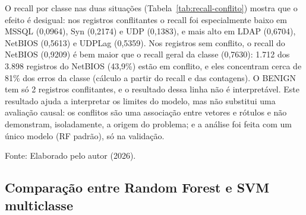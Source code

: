 \documentclass[
    12pt,                %
    openright,           %
    oneside,             %
    a4paper,             %
    english,             %
    brazil               %
]{abntex2}
\begin{document}
O recall por classe nas duas situações (Tabela~\ref{tab:recall-conflito}) mostra que o efeito é desigual: nos registros conflitantes o recall foi especialmente baixo em MSSQL (0,0964), Syn (0,2174) e UDP (0,1383), e mais alto em LDAP (0,6704), NetBIOS (0,5613) e UDPLag (0,5359). Nos registros sem conflito, o recall do NetBIOS (0,9209) é bem maior que o recall geral da classe (0,7630): 1.712 dos 3.898 registros do NetBIOS (43,9\%) estão em conflito, e eles concentram cerca de 81\% dos erros da classe (cálculo a partir do recall e das contagens). O BENIGN tem só 2 registros conflitantes, e o resultado dessa linha não é interpretável. Este resultado ajuda a interpretar os limites do modelo, mas não substitui uma avaliação causal: os conflitos são uma associação entre vetores e rótulos e não demonstram, isoladamente, a origem do problema; e a análise foi feita com um único modelo (RF padrão), só na validação.
 
\begin{table}
\centering
\caption{Recall do RF padrão na validação, nas linhas com e sem conflito entre as sete classes}
\label{tab:recall-conflito}
\par\smallskip
Fonte: Elaborado pelo autor (2026).
\end{table}
 
 
\subsection{Comparação entre Random Forest e SVM multiclasse}
\label{sec:comparacao-rf-svm-multi}
 
\end{document}
